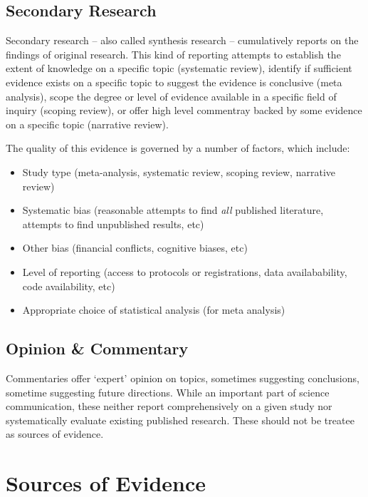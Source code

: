 \documentclass[
]{book}
\providecommand{\tightlist}{%
  \setlength{\itemsep}{0pt}\setlength{\parskip}{0pt}}
\begin{document}
\subsection{Secondary Research}\label{secondary-research}

Secondary research -- also called synthesis research -- cumulatively reports on the findings of original research. This kind of reporting attempts to establish the extent of knowledge on a specific topic (systematic review), identify if sufficient evidence exists on a specific topic to suggest the evidence is conclusive (meta analysis), scope the degree or level of evidence available in a specific field of inquiry (scoping review), or offer high level commentray backed by some evidence on a specific topic (narrative review).

The quality of this evidence is governed by a number of factors, which include:

\begin{itemize}
\tightlist
\item
  Study type (meta-analysis, systematic review, scoping review, narrative review)
\item
  Systematic bias (reasonable attempts to find \emph{all} published literature, attempts to find unpublished results, etc)
\item
  Other bias (financial conflicts, cognitive biases, etc)
\item
  Level of reporting (access to protocols or registrations, data availabability, code availability, etc)
\item
  Appropriate choice of statistical analysis (for meta analysis)
\end{itemize}

\subsection{Opinion \& Commentary}\label{opinion-commentary}

Commentaries offer `expert' opinion on topics, sometimes suggesting conclusions, sometime suggesting future directions. While an important part of science communication, these neither report comprehensively on a given study nor systematically evaluate existing published research. These should not be treatee as sources of evidence.

\section{Sources of Evidence}\label{sources-of-evidence}
\end{document}
